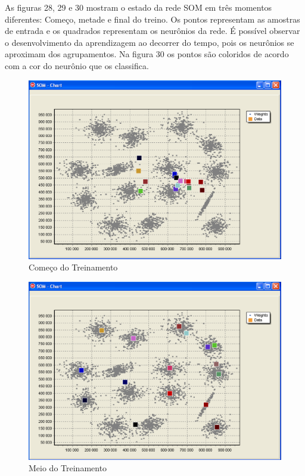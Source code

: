 As figuras 28, 29 e 30 mostram o estado da rede SOM em três momentos diferentes: Começo, metade e final do treino. Os pontos representam as amostras de entrada e os quadrados representam os neurônios da rede. É possível observar o desenvolvimento da aprendizagem ao decorrer do tempo, pois os neurônios se aproximam dos agrupamentos. Na figura 30 os pontos são coloridos de acordo com a cor do neurônio que os classifica.

\begin{figure}[!h]
\centering
\includegraphics[keepaspectratio=true,scale=0.5]
{figuras/som1.eps}
\caption{Começo do Treinamento}
\label{data_titatic}
\end{figure} 


\begin{figure}[!h]
\centering
\includegraphics[keepaspectratio=true,scale=0.5]
{figuras/som2.eps}
\caption{Meio do Treinamento}
\label{data_titatic}
\end{figure} 


